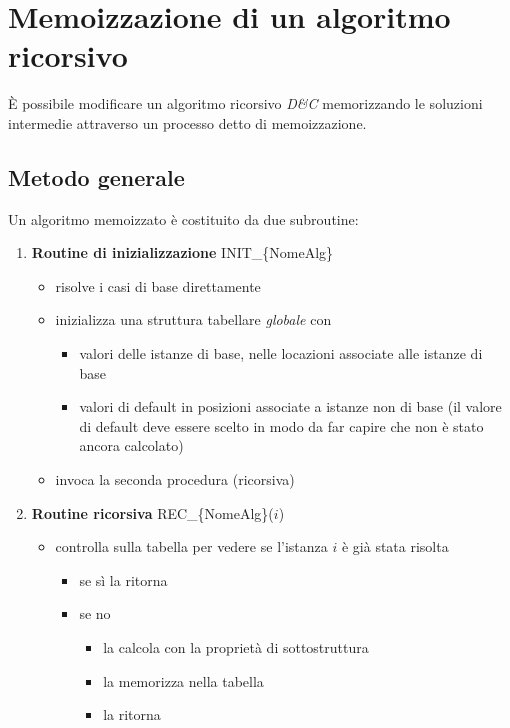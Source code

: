 \section{Memoizzazione di un algoritmo ricorsivo}

È possibile modificare un algoritmo ricorsivo \emph{D\&C} memorizzando le soluzioni intermedie attraverso un processo detto di memoizzazione.

\subsection{Metodo generale}

Un algoritmo memoizzato è costituito da due subroutine:
\begin{enumerate}
    \item \textbf{Routine di inizializzazione} INIT\_\{NomeAlg\}
        \begin{itemize}
            \item risolve i casi di base direttamente
            \item inizializza una struttura tabellare \emph{globale} con
                \begin{itemize}
                    \item valori delle istanze di base, nelle locazioni associate alle istanze di base
                    \item valori di default in posizioni associate a istanze non di base (il valore di default deve essere scelto in modo da far capire che non è stato ancora calcolato)
                \end{itemize}
            \item invoca la seconda procedura (ricorsiva) \\ %
        \end{itemize}
    \item \textbf{Routine ricorsiva} REC\_\{NomeAlg\}($i$)
        \begin{itemize}
            \item controlla sulla tabella per vedere se l'istanza $i$ è già stata risolta
                \begin{itemize}
                    \item se sì la ritorna
                    \item se no
                        \begin{itemize}
                            \item la calcola con la proprietà di sottostruttura
                            \item la memorizza nella tabella
                            \item la ritorna
                        \end{itemize}
                \end{itemize}
        \end{itemize}
\end{enumerate}

